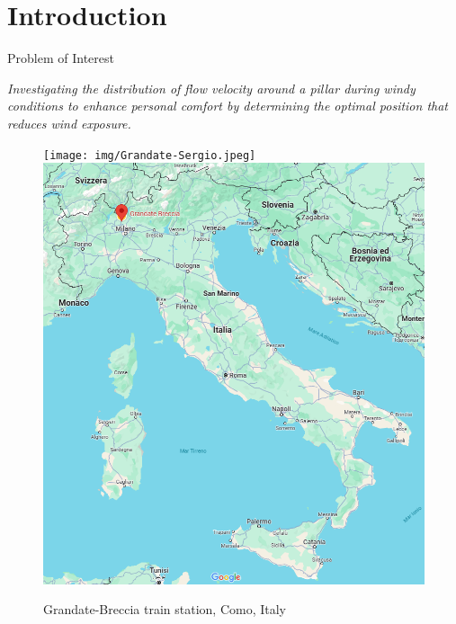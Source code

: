 \section{Introduction}

\begin{frame}{Problem of Interest}

    \textit{Investigating the distribution of flow velocity around a pillar during windy conditions to enhance personal comfort by determining the optimal position that reduces wind exposure.}

    \vspace{9pt}

    \begin{figure}

        \centering
        \texttt{[image: img/Grandate-Sergio.jpeg]}
        \hfill
        \includegraphics[height=0.45\textheight]{img/Italy-map.png}

        \caption{Grandate-Breccia train station\footnotemark[1], Como, Italy}

    \end{figure}


\end{frame}


